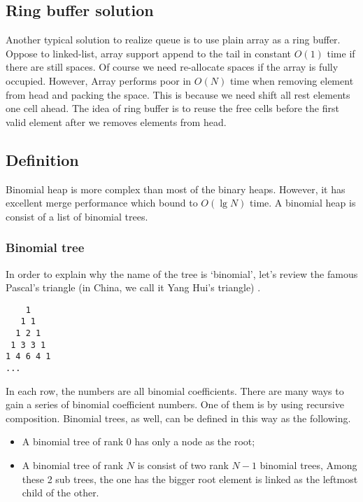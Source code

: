 \documentclass{article}
\begin{document}
\subsection{Ring buffer solution}

Another typical solution to realize queue is to use plain array as
a ring buffer. Oppose to linked-list, array support append to the 
tail in constant $O(1)$ time if there are still spaces. Of course
we need re-allocate spaces if the array is fully occupied. However,
Array performs poor in $O(N)$ time when removing element from head
and packing the space. This is because we need shift all rest elements
one cell ahead. The idea of ring buffer is to reuse the free
cells before the first valid element after we removes elements from
head.


\subsection{Definition}

Binomial heap is more complex than most of the binary heaps. However,
it has excellent merge performance which bound to $O(\lg N)$ time. A
binomial heap is consist of a list of binomial trees.

\subsubsection{Binomial tree}
\label{Binomial tree} 

In order to explain why the name of the tree is `binomial', let's review
the famous Pascal's triangle (in China, we call it Yang Hui's triangle)
\cite{wiki-pascal-triangle}.

\begin{verbatim}
    1
   1 1
  1 2 1
 1 3 3 1
1 4 6 4 1
...
\end{verbatim}

In each row, the numbers are all binomial coefficients. There are many
ways to gain a series of binomial coefficient numbers. One of them is
by using recursive composition. Binomial trees, as well, can be defined
in this way as the following.

\begin{itemize}
\item A binomial tree of rank 0 has only a node as the root;
\item A binomial tree of rank $N$ is consist of two rank $N-1$ binomial trees,
Among these 2 sub trees, the one has the bigger root element is linked as the
leftmost child of the other.
\end{itemize}
\end{document}
